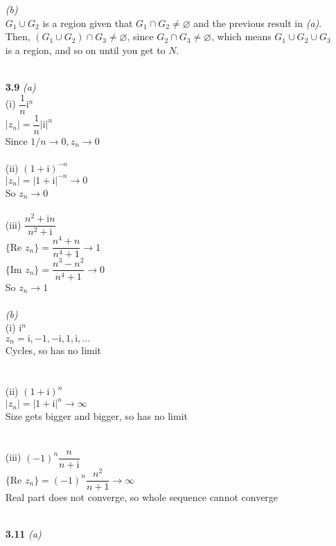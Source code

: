 \begin{enumerate}
\textit{(b)} \\
$G_1 \cup G_2$ is a region given that $G_1 \cap G_2 \ne \varnothing$ and the previous result in \textit{(a)}. Then, $(G_1 \cup G_2) \cap G_3 \ne \varnothing$, since $G_2 \cap G_3 \ne \varnothing$, which means $G_1 \cup G_2 \cup G_3$ is a region, and so on until you get to $N$. 
\\\\
\item[\textbf{3.9}]
\textit{(a)} \\
(i) $\dfrac{1}{n}\mathrm{i}^n$ \\
$|z_n|=\dfrac{1}{n}|\mathrm{i}|^n$ \\
Since $1/n\rightarrow0, z_n\rightarrow0$ \\
\\
(ii) $(1+\mathrm{i})^{-n}$ \\
$|z_n|=|1+\mathrm{i}|^{-n}\rightarrow0$\\
So $z_n\rightarrow0$
\\\\
(iii) $\dfrac{n^2+\mathrm{i}n}{n^2+\mathrm{i}}$ \\
$\{\text{Re }z_n\} = \dfrac{n^4+n}{n^4+1}\rightarrow 1$\\
$\{\text{Im }z_n\} = \dfrac{n^3-n^2}{n^4+1}\rightarrow 0$\\
So $z_n\rightarrow1$
\\\\
\textit{(b)} \\
(i) $\mathrm{i}^n$ \\
$z_n = \mathrm{i}, -1, -\mathrm{i}, 1, \mathrm{i}, ...$ \\
Cycles, so has no limit \\
\\\\
(ii) $(1+\mathrm{i})^{n}$ \\
$|z_n|=|1+\mathrm{i}|^{n}\rightarrow\infty$\\
Size gets bigger and bigger, so has no limit\\
\\\\
(iii) $(-1)^n\dfrac{n}{n+\mathrm{i}}$ \\
$\{\text{Re }z_n\} = (-1)^n\dfrac{n^2}{n+1}\rightarrow\infty$\\
Real part does not converge, so whole sequence cannot converge
\\\\
\item[\textbf{3.11}]
\textit{(a)} \\

\end{enumerate}
